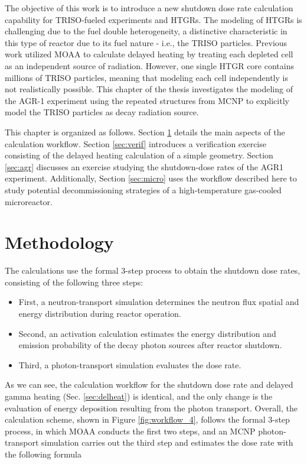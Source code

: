 The objective of this work is to introduce a new shutdown dose rate calculation capability for TRISO-fueled experiments and HTGRs.
The modeling of HTGRs is challenging due to the fuel double heterogeneity, a distinctive characteristic in this type of reactor due to its fuel nature - i.e., the \gls*{TRISO} particles.
Previous work \cite{fairhurst_decay_2022, fairhurst_demonstration_2022, fairhurst_database_2022} utilized MOAA to calculate delayed heating by treating each depleted cell as an independent source of radiation.
However, one single HTGR core contains millions of TRISO particles, meaning that modeling each cell independently is not realistically possible.
This chapter of the thesis investigates the modeling of the AGR-1 experiment using the repeated structures from MCNP to explicitly model the TRISO particles as decay radiation source.

This chapter is organized as follows.
Section \ref{sec:methodology} details the main aspects of the calculation workflow.
Section \ref{sec:verif} introduces a verification exercise consisting of the delayed heating calculation of a simple geometry.
Section \ref{sec:agr} discusses an exercise studying the shutdown-dose rates of the \gls*{AGR1} experiment.
Additionally, Section \ref{sec:micro} uses the workflow described here to study potential decommissioning strategies of a high-temperature gas-cooled microreactor.


\section{Methodology}
\label{sec:methodology}

The calculations use the formal 3-step process to obtain the shutdown dose rates, consisting of the following three steps:
\begin{itemize}
  \item First, a neutron-transport simulation determines the neutron flux spatial and energy distribution during reactor operation.
  \item Second, an activation calculation estimates the energy distribution and emission probability of the decay photon sources after reactor shutdown.
  \item Third, a photon-transport simulation evaluates the dose rate.
\end{itemize}

As we can see, the calculation workflow for the shutdown dose rate and delayed gamma heating (Sec. \ref{sec:delheat}) is identical, and the only change is the evaluation of energy deposition resulting from the photon transport.
Overall, the calculation scheme, shown in Figure \ref{fig:workflow_4}, follows the formal 3-step process, in which MOAA conducts the first two steps, and an MCNP photon-transport simulation carries out the third step and estimates the dose rate with the following formula

